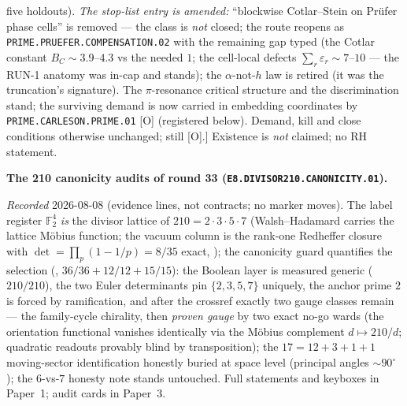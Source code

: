 {five holdouts).  \emph{The stop-list entry is amended:}
``blockwise Cotlar--Stein on Pr\"ufer phase cells'' is removed
--- the class is \emph{not} closed; the route reopens as
\texttt{PRIME.PRUEFER.COMPENSATION.02} with the remaining gap
typed (the Cotlar constant $B_C \sim 3.9$--$4.3$ vs the needed
$1$; the cell-local defects $\sum_r\varepsilon_r \sim 7$--$10$
--- the RUN-1 anatomy was in-cap and stands); the
$\alpha$-not-$h$ law is retired (it was the truncation's
signature).  The $\pi$-resonance critical structure and the
discrimination stand; the surviving demand is now carried in
embedding coordinates by \texttt{PRIME.CARLESON.PRIME.01} [O]
(registered below).  Demand, kill and close conditions
otherwise unchanged; still [O].]
Existence is \emph{not}
claimed; no RH statement.\par}


\par\smallskip\noindent\textbf{The 210 canonicity audits of
round 33 (\texttt{E8.DIVISOR210.\allowbreak CANONICITY.01}).}
{\sloppy
\emph{Recorded} 2026-08-08 (evidence lines, not contracts; no
marker moves).  The label register $\mathbb{F}_2^4$ \emph{is}
the divisor lattice of $210 = 2\cdot3\cdot5\cdot7$
(Walsh--Hadamard carries the lattice M\"obius function; the
vacuum column is the rank-one Redheffer closure with
$\det = \prod_p(1 - 1/p) = 8/35$ exact,
); the canonicity guard
quantifies the selection
(, $36/36 + 12/12 + 15/15$):
the Boolean layer is measured generic ($210/210$), the two
Euler determinants pin $\{2,3,5,7\}$ uniquely, the anchor prime
$2$ is forced by ramification, and after the crossref exactly
two gauge classes remain --- the family-cycle chirality, then
\emph{proven gauge} by two exact no-go wards (the orientation
functional vanishes identically via the M\"obius complement
$d \mapsto 210/d$; quadratic readouts provably blind by
transposition); the $17 = 12{+}3{+}1{+}1$ moving-sector
identification honestly buried at space level (principal angles
${\sim}90^\circ$); the $6$-vs-$7$ honesty note stands
untouched.  Full statements and keyboxes in Paper~1; audit
cards in Paper~3.\par}


